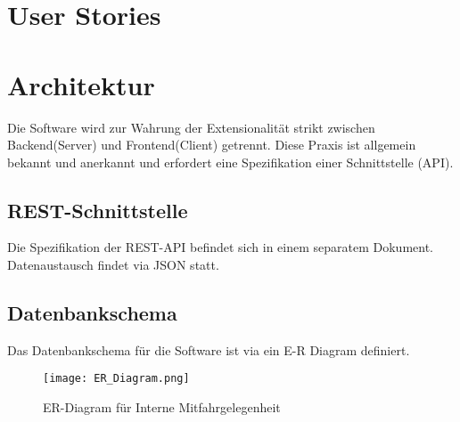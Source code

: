 \documentclass[11pt,a4paper]{article}
\begin{document}
\section{User Stories}
\section{Architektur}
Die Software wird zur Wahrung der Extensionalität strikt zwischen Backend(Server) und Frontend(Client) getrennt. Diese Praxis ist allgemein bekannt und anerkannt und erfordert eine Spezifikation einer Schnittstelle (API).
\subsection{REST-Schnittstelle}
Die Spezifikation der REST-API befindet sich in einem separatem Dokument.
Datenaustausch findet via JSON statt.
\subsection{Datenbankschema}
Das Datenbankschema für die Software ist via ein E-R Diagram definiert.\\
\begin{figure}[!htb]
\texttt{[image: ER\_Diagram.png]}
\caption{ER-Diagram für Interne Mitfahrgelegenheit}
\end{figure}
\end{document}
